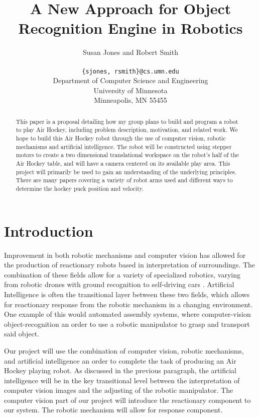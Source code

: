 \documentclass[letterpaper, 10 pt, conference]{ieeeconf}
\title{\bf
A New Approach for Object Recognition Engine in Robotics
}
\author{\parbox{5 in}{\centering Susan Jones and Robert Smith}\\
  {\tt\small \{sjones, rsmith\}@cs.umn.edu}\\
  Department of Computer Science and Engineering\\
  University of Minnesota\\
  Minneapolis, MN 55455\\
}
\begin{document}
\maketitle
\thispagestyle{empty}
\pagestyle{empty}

\begin{abstract}
This paper is a proposal detailing how my group plans to build and program a robot to play Air Hockey, including problem description, motivation, and related work. We hope to build this Air Hockey robot through the use of computer vision, robotic mechanisms and artificial intelligence. The robot will be constructed using stepper motors to create a two dimensional translational workspace on the robot’s half of the Air Hockey table, and will have a camera centered on its available play area. This project will primarily be used to gain an understanding of the underlying principles. There are many papers covering a variety of robot arms used and different ways to determine the hockey puck position and velocity.
\end{abstract}

\section{Introduction}
Improvement in both robotic mechanisms and computer vision has allowed for the production of reactionary robots based in interpretation of surroundings.  The combination of these fields allow for a variety of specialized robotics, varying from robotic drones \cite{3dr} with ground recognition to self-driving cars \cite{googlecar}.  Artificial Intelligence is often the transitional layer between these two fields, which allows for reactionary response from the robotic mechanism in a changing environment.  One example of this would automated assembly systems, where computer-vision object-recognition an order to use a robotic manipulator to grasp and transport said object.

Our project will use the combination of computer vision, robotic mechanisms, and artificial intelligence an order to complete the task of producing an Air Hockey playing robot.  As discussed in the previous paragraph, the artificial intelligence will be in the key transitional level between the interpretation of computer vision images and the adjusting of the robotic manipulator.  The computer vision part of our project will introduce the reactionary component to our system.  The robotic mechanism will allow for response component.
\end{document}
